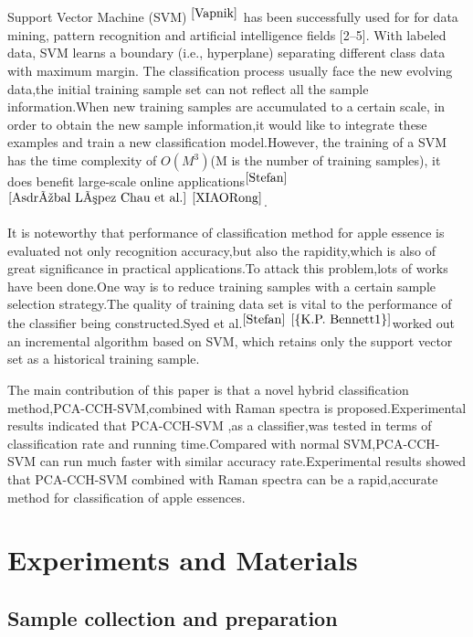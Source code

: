 \documentclass[a4paper]{article}
\begin{document}
Support Vector Machine (SVM) $^{\cite{Vapnik}}$ has been successfully used for for data mining, pattern recognition and artiﬁcial intelligence ﬁelds [2–5]. With labeled data, SVM learns a boundary (i.e., hyperplane) separating different class data with maximum margin.
The classification process usually face the new evolving data,the initial training sample set can not reflect all the sample information.When new training samples are accumulated to a certain scale, in order to obtain the new sample information,it would like to integrate these examples and train a new classification model.However, the training of a SVM has the time complexity of $O(M^3)$(M is the number of training samples), it does benefit large-scale online applications$^{\cite{Stefan}}$ $^{\cite{Asdrúbal López Chau et al.}}$ $^{\cite{XIAORong}}$.

It is noteworthy that performance of classification method for apple essence is evaluated not only recognition accuracy,but also the rapidity,which is also of great significance in practical applications.To attack this problem,lots of works have been done.One way is to reduce training samples with a certain sample selection strategy.The quality of training data set is vital to the performance of the classifier being constructed.Syed et al.$ ^{\cite{Stefan}}$ $ ^{\cite{{K.P. Bennett1}}}$worked out an incremental algorithm based on SVM, which retains only the support vector set as a historical training sample.

The main contribution of this paper is that a novel hybrid classification method,PCA-CCH-SVM,combined with Raman spectra is proposed.Experimental results indicated that PCA-CCH-SVM ,as a classifier,was tested in terms of classification rate and running time.Compared with normal SVM,PCA-CCH-SVM can run much faster with similar accuracy rate.Experimental results showed that PCA-CCH-SVM combined with Raman spectra can be a rapid,accurate  method for classification of apple essences.

\section{Experiments and Materials}
\subsection{Sample collection and preparation}
\end{document}
